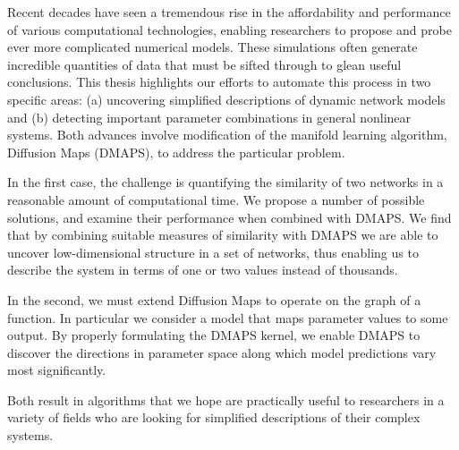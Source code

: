 
Recent decades have seen a tremendous rise in the affordability and
performance of various computational technologies, enabling
researchers to propose and probe ever more complicated numerical
models. These simulations often generate incredible quantities of data
that must be sifted through to glean useful conclusions. This thesis
highlights our efforts to automate this process in two specific areas:
(a) uncovering simplified descriptions of dynamic network models and
(b) detecting important parameter combinations in general nonlinear
systems. Both advances involve modification of the manifold learning algorithm, Diffusion Maps (DMAPS), to
address the particular problem.

In the first case, the challenge is quantifying the similarity of two
networks in a reasonable amount of computational time. We propose a
number of possible solutions, and examine their performance when
combined with DMAPS. We find that by combining suitable measures of
similarity with DMAPS we are able to uncover low-dimensional structure
in a set of networks, thus enabling us to describe the system in terms
of one or two values instead of thousands.

In the second, we must extend Diffusion Maps to operate on the graph
of a function. In particular we consider a model that maps parameter
values to some output. By properly formulating the DMAPS kernel, we enable DMAPS to discover the directions
in parameter space along which model predictions vary most
significantly.

Both result in algorithms that we hope are practically useful to
researchers in a variety of fields who are looking for simplified
descriptions of their complex systems.
